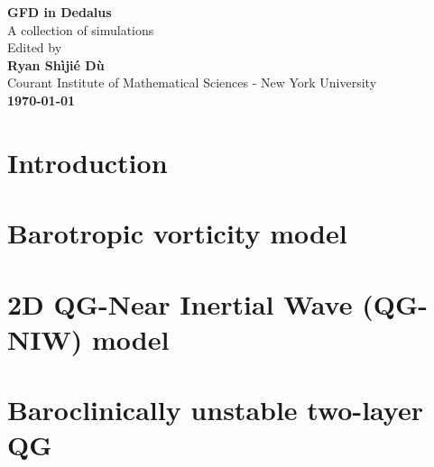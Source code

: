 \documentclass[11pt,letterpaper]{book}
\begin{document}
\begin{titlepage}
    \begin{center}
        \vspace*{4cm}
        \Huge
        \textbf{GFD in Dedalus} \\
        \vspace{0.5cm}
        \LARGE
        {A collection of simulations}\\
        \vspace{3cm}
        Edited by\\
        \vspace{0.5cm}
        \textbf{Ryan Sh\`iji\'e D\`u}\\
        \vspace{0.2cm}
        \normalsize
        {Courant Institute of Mathematical Sciences - New York University}\\
        \vspace{2cm}
        \Large
        \textbf{\today}
        
    \end{center}
\end{titlepage}

\setcounter{tocdepth}{4}
\tableofcontents
\chapter{Introduction}


\chapter{Barotropic vorticity model}\label{chap:Baro_vort}


% 

\chapter{2D QG-Near Inertial Wave (QG-NIW) model}


\chapter{Baroclinically unstable two-layer QG}





\newpage
\printbibliography
\end{document}
